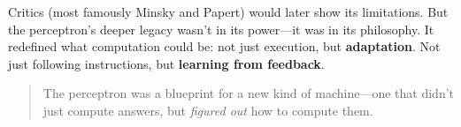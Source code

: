 \medskip

Critics (most famously Minsky and Papert) would later show its limitations. But the perceptron’s deeper legacy wasn’t in its power—it was in its philosophy. It redefined what computation could be: not just execution, but \textbf{adaptation}. Not just following instructions, but \textbf{learning from feedback}.

\begin{quote}
The perceptron was a blueprint for a new kind of machine—one that didn't just compute answers, but \emph{figured out} how to compute them.
\end{quote}

